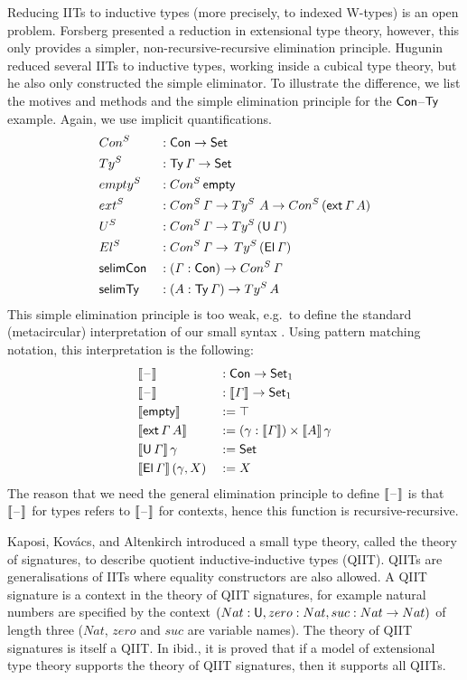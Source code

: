\documentclass[a4paper,UKenglish,cleveref, autoref]{lipics-v2019}
\begin{document}
Reducing IITs to inductive types (more precisely, to indexed W-types)
is an open problem. Forsberg \cite{forsberg-phd} presented a reduction in
extensional type theory, however, this only provides a simpler,
non-recursive-recursive elimination principle. Hugunin \cite{jasper}
reduced several IITs to inductive types, working inside a cubical type
theory, but he also only constructed the simple eliminator. To
illustrate the difference, we list the motives and methods and the
simple elimination principle for the $\mathsf{Con}$--$\mathsf{Ty}$ example. Again, we
use implicit quantifications.
\begin{alignat*}{5}
  & Con^S && : \mathsf{Con}\rightarrow\mathsf{Set} \\
  & Ty^S && : \mathsf{Ty}\,\mathit{\Gamma}\rightarrow\mathsf{Set} \\
  & {empty}^S && : Con^S\,\mathsf{empty} \\
  & {ext}^S && : Con^S\,\mathit{\Gamma}\rightarrow Ty^S\,\,A\rightarrow Con^S\,(\mathsf{ext}\,\mathit{\Gamma}\,A) \\
  & U^S && : Con^S\,\mathit{\Gamma}\rightarrow Ty^S\,(\mathsf{U}\,\mathit{\Gamma}) \\
  & El^S && : Con^S\,\mathit{\Gamma}\rightarrow\,Ty^S\,(\mathsf{El}\,\mathit{\Gamma}) \\
  & \mathsf{selimCon} && : (\mathit{\Gamma}:\mathsf{Con})\rightarrow Con^S\,\mathit{\Gamma} \\
  & \mathsf{selimTy} && : (A:\mathsf{Ty}\,\mathit{\Gamma})\rightarrow Ty^S\,A
\end{alignat*}
This simple elimination principle is too weak, e.g.\ to define the
standard (metacircular) interpretation of our small syntax
\cite{ttintt}. Using pattern matching notation, this interpretation is
the following:
\begin{alignat*}{5}
  & \llbracket\mathord{\hspace{1pt}\text{--}\hspace{1pt}}\rrbracket && : \mathsf{Con}\rightarrow\mathsf{Set}_1 \\
  & \llbracket\mathord{\hspace{1pt}\text{--}\hspace{1pt}}\rrbracket && : \llbracket\mathit{\Gamma}\rrbracket\rightarrow\mathsf{Set}_1 \\
  & \llbracket\mathsf{empty}\rrbracket && := \top \\
  & \llbracket\mathsf{ext}\,\mathit{\Gamma}\,A\rrbracket && := (\gamma:\llbracket\mathit{\Gamma}\rrbracket)\times\llbracket A\rrbracket\,\gamma \\
  & \llbracket\mathsf{U}\,\mathit{\Gamma}\rrbracket\,\gamma && := \mathsf{Set} \\
  & \llbracket\mathsf{El}\,\mathit{\Gamma}\rrbracket\,(\gamma,X) && := X
\end{alignat*}
The reason that we need the general elimination principle to define
$\llbracket\mathord{\hspace{1pt}\text{--}\hspace{1pt}}\rrbracket$ is that $\llbracket\mathord{\hspace{1pt}\text{--}\hspace{1pt}}\rrbracket$ for types refers to
$\llbracket\mathord{\hspace{1pt}\text{--}\hspace{1pt}}\rrbracket$ for contexts, hence this function is
recursive-recursive.

Kaposi, Kov{\'a}cs, and Altenkirch
\cite{Kaposi:2019:CQI:3302515.3290315} introduced a small type theory,
 called the theory of signatures, to describe quotient
inductive-inductive types (QIIT). QIITs are generalisations of IITs
where equality constructors are also allowed. A QIIT signature is a
context in the theory of QIIT signatures, for example natural numbers
are specified by the context $(Nat:\mathsf{U},zero:Nat,suc:Nat\rightarrow Nat)$ of
length three ($Nat$, $zero$ and $suc$ are variable names). The theory
of QIIT signatures is itself a QIIT. In ibid., it is proved that if a
model of extensional type theory supports the theory of QIIT
signatures, then it supports all QIITs.
\end{document}
